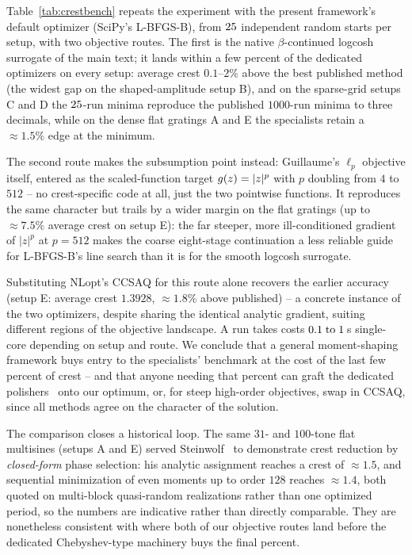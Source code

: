\documentclass[10pt,a4paper]{article}
\numberwithin{equation}{section}
\DeclarePairedDelimiter\abs{\lvert}{\rvert}
\DeclarePairedDelimiter\mat{(}{)}
\begin{document}
Table~\ref{tab:crestbench} repeats the experiment with the present framework's default optimizer (SciPy's L-BFGS-B), from $25$ independent random starts per setup, with two objective routes. The first is the native $\beta$-continued logcosh surrogate of the main text; it lands within a few percent of the dedicated optimizers on every setup: average crest $0.1$--$2\%$ above the best published method (the widest gap on the shaped-amplitude setup B), and on the sparse-grid setups C and D the $25$-run minima reproduce the published $1000$-run minima to three decimals, while on the dense flat gratings A and E the specialists retain a ${\approx}1.5\%$ edge at the minimum. 

The second route makes the subsumption point instead: Guillaume's $\ell_p$ objective itself, entered as the scaled-function target $g\mat{z}=\abs{z}^p$ with $p$ doubling from $4$ to $512$ -- no crest-specific code at all, just the two pointwise functions. It reproduces the same character but trails by a wider margin on the flat gratings (up to ${\approx}7.5\%$ average crest on setup E): the far steeper, more ill-conditioned gradient of $|z|^p$ at $p=512$ makes the coarse eight-stage continuation a less reliable guide for L-BFGS-B's line search than it is for the smooth logcosh surrogate. 

Substituting NLopt's CCSAQ for this route alone recovers the earlier accuracy (setup E: average crest $1.3928$, ${\approx}1.8\%$ above published) -- a concrete instance of the two optimizers, despite sharing the identical analytic gradient, suiting different regions of the objective landscape. A run takes costs $0.1\; \mathrm{to}\; 1\,$s single-core depending on setup and route. We conclude that a general moment-shaping framework buys entry to the specialists' benchmark at the cost of the last few percent of crest -- and that anyone needing that percent can graft the dedicated polishers~\cite{guillaume1991crest,retzler2022crest} onto our optimum, or, for steep high-order objectives, swap in CCSAQ, since all methods agree on the character of the solution.

The comparison closes a historical loop. The same $31$- and $100$-tone flat multisines (setups A and E) served Steinwolf~\cite{steinwolf2011ifft} to demonstrate crest reduction by \emph{closed-form} phase selection: his analytic assignment reaches a crest of ${\approx}1.5$, and sequential minimization of even moments up to order $128$ reaches ${\approx}1.4$, both quoted on multi-block quasi-random realizations rather than one optimized period, so the numbers are indicative rather than directly comparable. They are nonetheless consistent with where both of our objective routes land before the dedicated Chebyshev-type machinery buys the final percent. 
\end{document}
